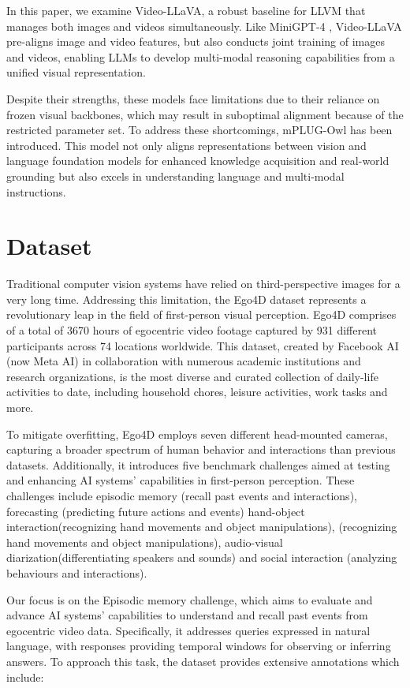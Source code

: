 \documentclass[conference]{IEEEtran}
\begin{document}
In this paper, we examine Video-LLaVA, a robust baseline for LLVM that manages both images and videos simultaneously. Like MiniGPT-4 \cite{b6}, Video-LLaVA pre-aligns image and video features, but also conducts joint training of images and videos, enabling LLMs to develop multi-modal reasoning capabilities from a unified visual representation.

Despite their strengths, these models face limitations due to their reliance on frozen visual backbones, which may result in suboptimal alignment because of the restricted parameter set. To address these shortcomings, mPLUG-Owl \cite{b7} has been introduced. This model not only aligns representations between vision and language foundation models for enhanced knowledge acquisition and real-world grounding but also excels in understanding language and multi-modal instructions.


\section{Dataset}
Traditional computer vision systems have relied on third-perspective images for a very long time. Addressing this limitation, the Ego4D dataset represents a revolutionary leap in the field of first-person visual perception. Ego4D comprises of a total of 3670 hours of egocentric video footage captured by 931 different participants across 74 locations worldwide. This dataset, created by Facebook AI (now Meta AI) in collaboration with numerous academic institutions and research organizations, is the most diverse and curated collection of daily-life activities to date, including household chores, leisure activities, work tasks and more. 

To mitigate overfitting, Ego4D employs seven different head-mounted cameras, capturing a broader spectrum of human behavior and interactions than previous datasets. Additionally, it introduces five benchmark challenges aimed at testing and enhancing AI systems' capabilities in first-person perception. These challenges include episodic memory (recall past events and interactions), forecasting (predicting future actions and events) hand-object interaction(recognizing hand movements and object manipulations), (recognizing hand movements and object manipulations), audio-visual diarization(differentiating speakers and sounds) and social interaction (analyzing behaviours and interactions). 

Our focus is on the Episodic memory challenge, which aims to evaluate and advance AI systems’ capabilities to understand and recall past events from egocentric video data. Specifically, it addresses queries expressed in natural language, with responses providing temporal windows for observing or inferring answers. To approach this task, the dataset provides extensive annotations which include:
\end{document}
